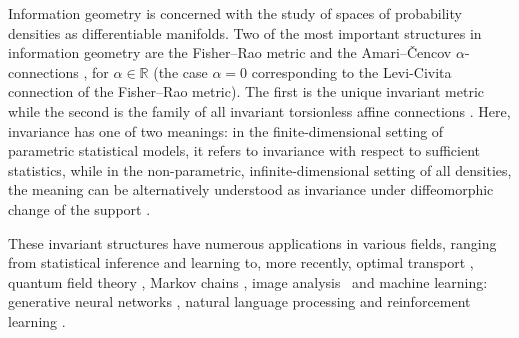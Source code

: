 \documentclass[11pt,reqno]{amsart}
\theoremstyle{definition}
\begin{document}
Information geometry is concerned with the study of spaces of probability densities as differentiable manifolds. 
Two of the most important structures in information geometry are the Fisher--Rao metric \cite{rao1945,friedrich1991} and the Amari--\v{C}encov $\alpha$-connections \cite{cencov1982,amari2000methods,gibilisco1998connections,newton2012infinite}, for $\alpha\in \mathbb{R}$ (the case $\alpha=0$ corresponding to the Levi-Civita connection of the Fisher--Rao metric).
The first is the unique invariant metric \cite{cencov1982,bauer2016uniqueness} while the second is the family of all invariant torsionless affine connections \cite{ay2015information}.
Here, invariance %
has one of two meanings: in the finite-dimensional setting of parametric statistical models, it refers to invariance with respect to sufficient statistics, while in %
the non-parametric, infinite-dimensional setting of all densities, the meaning can be alternatively understood as invariance under diffeomorphic change of the support \cite{ay2015information, bauer2016uniqueness}.

These %
invariant structures have numerous applications in various fields, ranging from statistical inference and learning \cite{amari2016information} to, more recently, optimal transport \cite{ay2024information}, quantum field theory \cite{naudts2024duality}, Markov chains \cite{wolfer2023information}, image analysis~\cite{bauer2015diffeomorphic} and machine learning: generative neural networks \cite{cheng2025alpha}, natural language processing \cite{volpi2021natural} and reinforcement learning \cite{nedergaard2025information}. 
\end{document}
